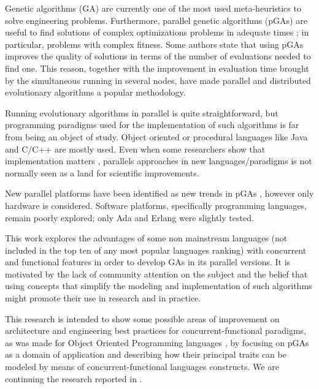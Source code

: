 
\noindent Genetic algorithms (GA) \cite{GA_Goldberg89} are currently one of the most used meta-heuristics to solve engineering problems. Furthermore, parallel genetic algorithms (pGAs) are useful to find  solutions of complex optimizations problems in adequate times \cite{Luque2011}; in particular, problems with complex fitness. Some authors \cite{Alba2001} state that using pGAs improves the quality of solutions in terms of the number of evaluations needed to find one. This reason, together with the improvement in evaluation time brought by the simultaneous running in several nodes, have made parallel and distributed evolutionary algorithms a popular methodology.

Running evolutionary algorithms in parallel is quite straightforward, but programming paradigms used for the implementation of such algorithms is far from being an object of study. Object oriented or procedural languages like Java and C/C++ are mostly used. Even when some researchers show that implementation matters \cite{DBLP:conf/iwann/MereloRACML11}, parallels approaches in new languages/paradigms is not normally seen as a land for scientific improvements.

New parallel platforms have been identified as new trends in pGAs \cite{Luque2011}, however only hardware is considered. Software platforms, specifically programming languages, remain poorly explored; only Ada \cite{Santos2002} and Erlang \cite{A.Bienz2011,Kerdprasop2013} were slightly tested.


This work explores the advantages of some non mainstream languages (not included in the top ten of any most popular languages ranking) with concurrent and functional features in order to develop GAs in its parallel versions. It is motivated by the lack of community attention on the subject and the belief that using concepts that simplify the modeling and implementation of such algorithms might promote their use in research  and in practice.

This research is intended to show some possible areas of improvement on architecture and engineering best practices for concurrent-functional paradigms, as was made for Object Oriented Programming languages \cite{EO:FEA2000}, by focusing on pGAs as a domain of application and describing how their principal traits can be modeled by means of concurrent-functional languages constructs. We are continuing the research reported in \cite{DBLP:conf/gecco/CruzGGC13,J.Albert-Cruz2013}.

